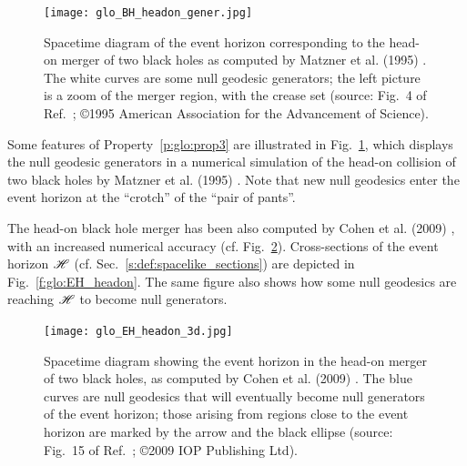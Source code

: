 \begin{figure}
\centerline{\texttt{[image: glo\_BH\_headon\_gener.jpg]}}
\caption[]{\label{f:glo:BH_headon_gener} \footnotesize
Spacetime diagram of the event horizon corresponding to the head-on merger of
two black holes as computed by Matzner et al. (1995) \cite{Matzn_al95}. The
white curves are some null geodesic generators; the left picture is a zoom of
the merger region, with the crease set
(source: Fig.~4 of Ref.~\cite{Matzn_al95}; \copyright 1995 American Association for the Advancement of Science).}
\end{figure}



Some features of Property~\ref{p:glo:prop3} are illustrated in Fig.~\ref{f:glo:BH_headon_gener},
which displays the null geodesic generators in a numerical simulation
of the head-on collision of two black holes by Matzner et al. (1995) \cite{Matzn_al95}.
Note that new null geodesics enter the event horizon at the ``crotch'' of the
``pair of pants''.

The head-on black hole merger has been also computed by Cohen et al. (2009) \cite{CohenPS09}, with an increased numerical accuracy (cf. Fig.~\ref{f:glo:EH_headon_3d}).
Cross-sections of the event horizon $\mathscr{H}$ (cf. Sec.~\ref{s:def:spacelike_sections})
are depicted in Fig.~\ref{f:glo:EH_headon}. The same figure also shows how
some null geodesics are reaching $\mathscr{H}$ to become null generators.


\begin{figure}
\centerline{\texttt{[image: glo\_EH\_headon\_3d.jpg]}}
\caption[]{\label{f:glo:EH_headon_3d} \footnotesize
Spacetime diagram showing the event horizon in the head-on merger of
two black holes, as computed by Cohen et al. (2009) \cite{CohenPS09}.
The blue curves are null geodesics that will eventually become null generators
of the event horizon; those arising from regions close to the event horizon
are marked by the arrow and the black ellipse
(source: Fig.~15 of Ref.~\cite{CohenPS09}; \copyright 2009 IOP Publishing Ltd).}
\end{figure}

